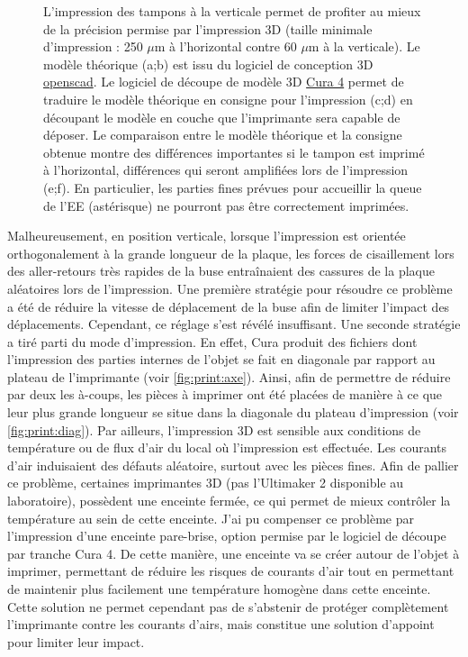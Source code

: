 \documentclass[\main/main.tex]{subfiles}
\begin{document}
\begin{figure}[h!]
    \caption{
        \label{fig:coupe}
        L'impression des tampons à la verticale permet de profiter au mieux de la précision permise par l'impression 3D (taille minimale d'impression : 250 $\mu$m à l'horizontal contre 60 $\mu$m à la verticale).
        \newline
        Le modèle théorique (a;b) est issu du logiciel de conception 3D \href{https://www.openscad.org/}{openscad}.
        Le logiciel de découpe de modèle 3D \href{https://ultimaker.com/fr/software/ultimaker-cura}{Cura 4} permet de traduire le modèle théorique en consigne pour l'impression (c;d) en découpant le modèle en couche que l'imprimante sera capable de déposer.
        Le comparaison entre le modèle théorique et la consigne obtenue montre des différences importantes si le tampon est imprimé à l'horizontal, différences qui seront amplifiées lors de l'impression (e;f).
        En particulier, les parties fines prévues pour accueillir la queue de l'EE (astérisque) ne pourront pas être correctement imprimées.
    }
    
\end{figure}

%
Malheureusement, en position verticale, lorsque l'impression est orientée orthogonalement à la grande longueur de la plaque, les forces de cisaillement lors des aller-retours très rapides de la buse entraînaient des cassures de la plaque aléatoires lors de l'impression.
%
Une première stratégie pour résoudre ce problème a été de réduire la vitesse de déplacement de la buse afin de limiter l'impact des déplacements. Cependant, ce réglage s'est révélé insuffisant.
%
Une seconde stratégie a tiré parti du mode d'impression. En effet, Cura produit des fichiers dont l'impression des parties internes de l'objet se fait en diagonale par rapport au plateau de l'imprimante (voir \autoref{fig:print:axe}).
Ainsi, afin de permettre de réduire par deux les à-coups, les pièces à imprimer ont été placées de manière à ce que leur plus grande longueur se situe dans la diagonale du plateau d'impression (voir \autoref{fig:print:diag}).
%
Par ailleurs, l'impression 3D est sensible aux conditions de température ou de flux d'air du local où l'impression est effectuée. Les courants d'air induisaient des défauts aléatoire, surtout avec les pièces fines. Afin de pallier ce problème, certaines imprimantes 3D (pas l'Ultimaker 2 disponible au laboratoire), possèdent une enceinte fermée, ce qui permet de mieux contrôler la température au sein de cette enceinte. 
J'ai pu compenser ce problème par l'impression d'une enceinte pare-brise, option permise par le logiciel de découpe par tranche Cura 4.
%
De cette manière, une enceinte va se créer autour de l'objet à imprimer, permettant de réduire les risques de courants d'air tout en permettant de maintenir plus facilement une température homogène dans cette enceinte. Cette solution ne permet cependant pas de s'abstenir de protéger complètement l'imprimante contre les courants d'airs, mais constitue une solution d'appoint pour limiter leur impact.
\end{document}
